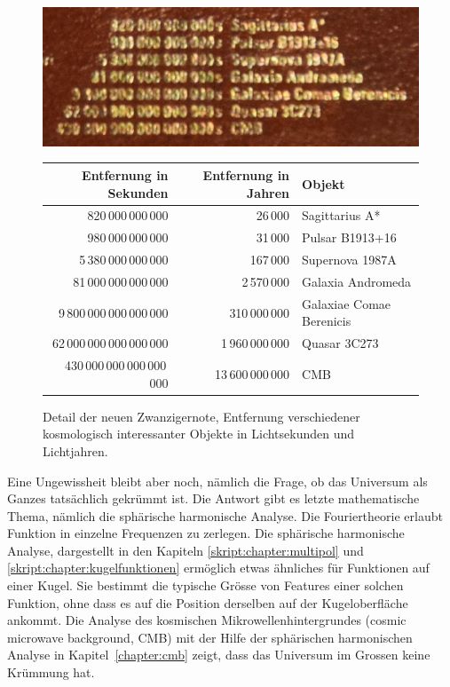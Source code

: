 \begin{figure}
\begin{center}
\includegraphics[width=0.7\hsize]{chapters/images/notendetail2.jpg}
\medskip

\begin{tabular}{|r|r|l|}
\hline
 Entfernung in Sekunden  &Entfernung in Jahren&Objekt                  \\
\hline
          820\,000\,000\,000&          26\,000&Sagittarius A*          \\
          980\,000\,000\,000&          31\,000&Pulsar B1913+16         \\
       5\,380\,000\,000\,000&         167\,000&Supernova 1987A         \\
      81\,000\,000\,000\,000&      2\,570\,000&Galaxia Andromeda       \\
  9\,800\,000\,000\,000\,000&    310\,000\,000&Galaxiae Comae Berenicis\\
 62\,000\,000\,000\,000\,000& 1\,960\,000\,000&Quasar 3C273            \\
430\,000\,000\,000\,000\,000&13\,600\,000\,000&CMB                     \\
\hline
\end{tabular}
\end{center}
\caption{Detail der neuen Zwanzigernote, Entfernung verschiedener
kosmologisch interessanter Objekte in Lichtsekunden und Lichtjahren.
\label{skript:einleitung:detail}}
\end{figure}


Eine Ungewissheit bleibt aber noch, nämlich die Frage, ob das
Universum als Ganzes tatsächlich gekrümmt ist.
Die Antwort gibt es letzte mathematische Thema, nämlich die
sphärische harmonische Analyse.
Die Fouriertheorie erlaubt Funktion in einzelne Frequenzen zu
zerlegen.
Die sphärische harmonische Analyse, dargestellt in den Kapiteln
\ref{skript:chapter:multipol} und \ref{skript:chapter:kugelfunktionen}
ermöglich etwas ähnliches für Funktionen auf einer Kugel. 
Sie bestimmt die typische Grösse von Features einer solchen
Funktion, ohne dass es auf die Position derselben auf der Kugeloberfläche
ankommt.
Die Analyse des kosmischen Mikrowellenhintergrundes (cosmic microwave
background, CMB) mit der Hilfe der sphärischen harmonischen Analyse
in Kapitel~\ref{chapter:cmb} zeigt, dass das Universum im Grossen
keine Krümmung hat.


